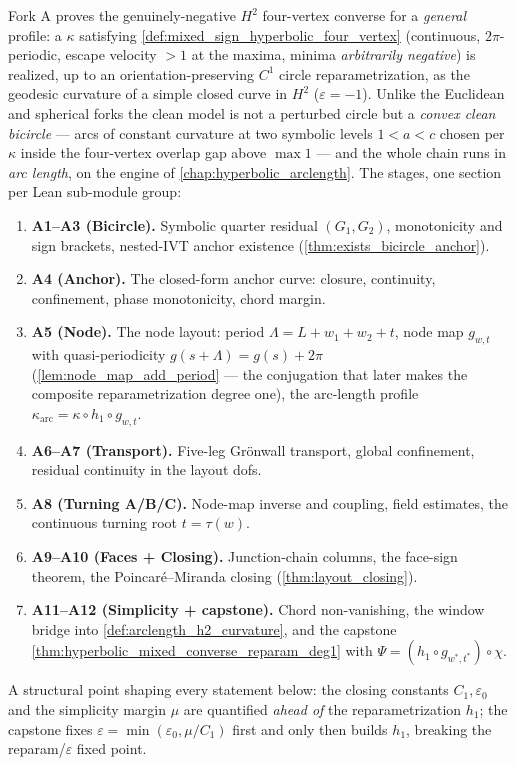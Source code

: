 Fork A proves the genuinely-negative $H^2$ four-vertex converse for a
\emph{general} profile: a $\kappa$ satisfying
\cref{def:mixed_sign_hyperbolic_four_vertex} (continuous, $2\pi$-periodic,
escape velocity $>1$ at the maxima, minima \emph{arbitrarily negative}) is
realized, up to an orientation-preserving $C^1$ circle reparametrization, as
the geodesic curvature of a simple closed curve in $H^2$ ($\varepsilon=-1$).
Unlike the Euclidean and spherical forks the clean model is not a perturbed
circle but a \emph{convex clean bicircle} — arcs of constant curvature at two
symbolic levels $1<a<c$ chosen per $\kappa$ inside the four-vertex overlap gap
above $\max 1$ — and the whole chain runs in \emph{arc length}, on the engine
of \cref{chap:hyperbolic_arclength}.  The stages, one section per Lean
sub-module group:
\begin{enumerate}
\item \textbf{A1--A3 (Bicircle).}  Symbolic quarter residual $(G_1,G_2)$,
  monotonicity and sign brackets, nested-IVT anchor existence
  (\cref{thm:exists_bicircle_anchor}).
\item \textbf{A4 (Anchor).}  The closed-form anchor curve: closure,
  continuity, confinement, phase monotonicity, chord margin.
\item \textbf{A5 (Node).}  The node layout: period $\Lambda=L+w_1+w_2+t$,
  node map $g_{w,t}$ with quasi-periodicity $g(s+\Lambda)=g(s)+2\pi$
  (\cref{lem:node_map_add_period} — the conjugation that later makes the
  composite reparametrization degree one), the arc-length profile
  $\kappa_{\mathrm{arc}}=\kappa\circ h_1\circ g_{w,t}$.
\item \textbf{A6--A7 (Transport).}  Five-leg Grönwall transport, global
  confinement, residual continuity in the layout dofs.
\item \textbf{A8 (Turning A/B/C).}  Node-map inverse and coupling, field
  estimates, the continuous turning root $t=\tau(w)$.
\item \textbf{A9--A10 (Faces + Closing).}  Junction-chain columns, the
  face-sign theorem, the Poincaré--Miranda closing
  (\cref{thm:layout_closing}).
\item \textbf{A11--A12 (Simplicity + capstone).}  Chord non-vanishing, the
  window bridge into \cref{def:arclength_h2_curvature}, and the capstone
  \cref{thm:hyperbolic_mixed_converse_reparam_deg1} with
  $\Psi=(h_1\circ g_{w^*,t^*})\circ\chi$.
\end{enumerate}
A structural point shaping every statement below: the closing constants
$C_1,\varepsilon_0$ and the simplicity margin $\mu$ are quantified
\emph{ahead of} the reparametrization $h_1$; the capstone fixes
$\varepsilon=\min(\varepsilon_0,\mu/C_1)$ first and only then builds $h_1$,
breaking the reparam/$\varepsilon$ fixed point.

